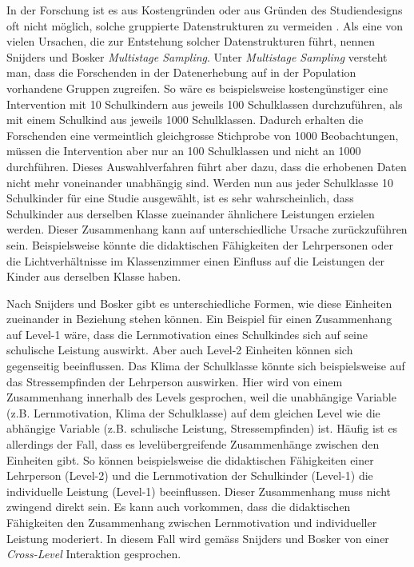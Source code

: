 \documentclass[12pt, a4paper]{article}\usepackage[]{graphicx}\usepackage[]{color}
\begin{document}
In der Forschung ist es aus Kostengründen oder aus Gründen des Studiendesigns oft nicht möglich, solche gruppierte Datenstrukturen zu vermeiden \citep{SnijdersTomA.B2012Ma:a, woltman2012introduction}. Als eine von vielen Ursachen, die zur Entstehung solcher Datenstrukturen führt, nennen Snijders und Bosker \citeyearpar{SnijdersTomA.B2012Ma:a} \textit{Multistage Sampling}. Unter \textit{Multistage Sampling} versteht man, dass die Forschenden in der Datenerhebung auf in der Population vorhandene Gruppen zugreifen. So wäre es beispielsweise kostengünstiger eine Intervention mit 10 Schulkindern aus jeweils 100 Schulklassen durchzuführen, als mit einem Schulkind aus jeweils 1000 Schulklassen. Dadurch erhalten die Forschenden eine vermeintlich gleichgrosse Stichprobe von 1000 Beobachtungen, müssen die Intervention aber nur an 100 Schulklassen und nicht an 1000 durchführen. Dieses Auswahlverfahren führt aber dazu, dass die erhobenen Daten nicht mehr voneinander unabhängig sind. Werden nun aus jeder Schulklasse 10 Schulkinder für eine Studie ausgewählt, ist es sehr wahrscheinlich, dass Schulkinder aus derselben Klasse zueinander ähnlichere Leistungen erzielen werden. Dieser Zusammenhang kann auf unterschiedliche Ursache zurückzuführen sein. Beispielsweise könnte die didaktischen Fähigkeiten der Lehrpersonen oder die Lichtverhältnisse im Klassenzimmer einen Einfluss auf die Leistungen der Kinder aus derselben Klasse haben. 

Nach Snijders und Bosker \citeyearpar{SnijdersTomA.B2012Ma:a} gibt es unterschiedliche Formen, wie diese Einheiten zueinander in Beziehung stehen können. Ein Beispiel für einen Zusammenhang auf Level-1 wäre, dass die Lernmotivation eines Schulkindes sich auf seine schulische Leistung auswirkt. Aber auch Level-2 Einheiten können sich gegenseitig beeinflussen. Das Klima der Schulklasse könnte sich beispielsweise auf das Stressempfinden der Lehrperson auswirken. Hier wird von einem Zusammenhang innerhalb des Levels gesprochen, weil die unabhängige Variable (z.B. Lernmotivation, Klima der Schulklasse) auf dem gleichen Level wie die abhängige Variable (z.B. schulische Leistung, Stressempfinden) ist. Häufig ist es allerdings der Fall, dass es levelübergreifende Zusammenhänge zwischen den Einheiten gibt. So können beispielsweise die didaktischen Fähigkeiten einer Lehrperson (Level-2) und die Lernmotivation der Schulkinder (Level-1) die individuelle Leistung (Level-1) beeinflussen. Dieser Zusammenhang muss nicht zwingend direkt sein. Es kann auch vorkommen, dass die didaktischen Fähigkeiten den Zusammenhang zwischen Lernmotivation und individueller Leistung moderiert. In diesem Fall wird gemäss Snijders und Bosker \citeyearpar{SnijdersTomA.B2012Ma:a} von einer \textit{Cross-Level} Interaktion gesprochen.
\end{document}
